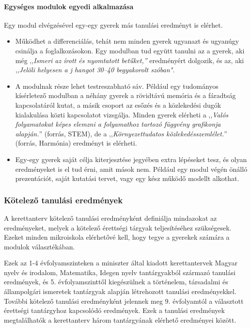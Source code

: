 \paragraph{Egységes modulok egyedi alkalmazása}

Egy modul elvégzésével egy-egy gyerek más tanulási eredményt is elérhet.

\begin{itemize}
  \item
        Működhet a differenciálás, tehát nem minden gyerek ugyanazt és
        ugyanúgy csinálja a foglalkozásokon. Egy modulban tud
        együtt  tanulni az a gyerek, aki még ,,\emph{Ismeri az
          írott és nyomtatott  betűket,''} eredményért dolgozik,
        és az, aki ,,\emph{Jelöli helyesen a j  hangot 30--40
          begyakorolt szóban".}
  \item
        A modulnak része lehet testreszabható sáv. Például egy tudományos
        kísérletező modulban a néhány gyerek a rövidtávú
        memória és a	fáradtság kapcsolatáról kutat, a másik
        csoport az esőzés és a  közlekedési dugók kialakulása
        közti kapcsolatot vizsgálja. Minden  gyerek elérheti a
        ,,\emph{Valós folyamatokat képes elemzni a folyamathoz
          tartozó függvény grafikonja alapján.}'' (forrás, STEM), de a
        ,,\emph{Környezettudatos közlekedésszemlélet.}''
        (forrás, Harmónia)  eredményt is elérheti.
  \item
        Egy-egy gyerek saját célja kiterjesztése jegyében extra lépéseket
        tesz, és olyan eredményeket is el tud érni, amit mások
        nem.	Például egy modul végén önálló prezentációt, saját
        kutatási  tervet, vagy egy kész működő modellt alkothat.
\end{itemize}

\subsubsection{Kötelező tanulási eredmények}
\label{sec:kotelezo_tanulasi_eredmenyek}
A kerettanterv kötelező tanulási eredményként definiálja mindazokat az
eredményeket, melyek a kötelező érettségi tárgyak teljesítéséhez
szükségesek. Ezeket minden mikroiskola elérhetővé kell, hogy tegye a
gyerekek számára a modulok választékában.

Ezek az 1-4 évfolyamszinteken a miniszter által kiadott kerettantervek
Magyar nyelv és irodalom, Matematika, Idegen nyelv tantárgyakból
származó tanulási eredmények, és 5. évfolyamszinttől kiegészülnek a
történelem, társadalmi és állampolgári ismeretek tantárgyak alapján
létrehozott tanulási eredményekkel. További kötelező tanulási
eredményként jelennek meg 9. évfolyamtól a választott érettségi
tantárgyhoz kapcsolódó eredmények. Ezek a tanulási eredmények
megtalálhatók a kerettanterv három tantárgyának elérhető eredményei
között.

